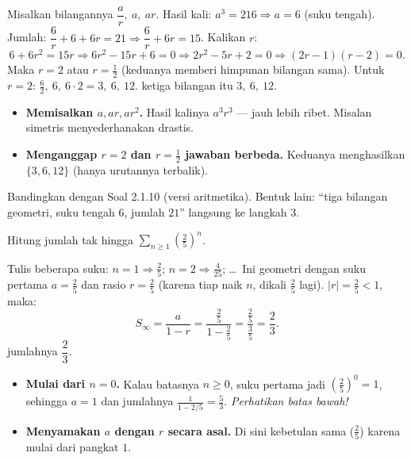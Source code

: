\jawab
{} Misalkan bilangannya $\dfrac ar,\ a,\ ar$.
 Hasil kali: $a^3=216 \Rightarrow a=6$ (suku tengah).
 Jumlah: $\dfrac6r+6+6r=21 \Rightarrow \dfrac6r+6r=15$. Kalikan $r$:
\[
6+6r^2=15r \Rightarrow 6r^2-15r+6=0 \Rightarrow 2r^2-5r+2=0 \Rightarrow (2r-1)(r-2)=0.
\]
Maka $r=2$ atau $r=\frac12$ (keduanya memberi himpunan bilangan sama).
 Untuk $r=2$: $\frac62,\ 6,\ 6\cdot2 = 3,\ 6,\ 12$.
\jadi ketiga bilangan itu $3,\ 6,\ 12$.

\begin{jebakan}
\begin{itemize}[leftmargin=*,topsep=2pt]
  \item \textbf{Memisalkan $a,ar,ar^2$.} Hasil kalinya $a^3r^3$ --- jauh lebih
  ribet. Misalan simetris menyederhanakan drastis.
  \item \textbf{Menganggap $r=2$ dan $r=\frac12$ jawaban berbeda.} Keduanya
  menghasilkan $\{3,6,12\}$ (hanya urutannya terbalik).
\end{itemize}
\end{jebakan}

\begin{variasi}
Bandingkan dengan Soal 2.1.10 (versi aritmetika). Bentuk lain: ``tiga bilangan
geometri, suku tengah $6$, jumlah $21$'' langsung ke langkah 3.
\end{variasi}

\begin{soalbox}{}
Hitung jumlah tak hingga $\displaystyle\sum_{n\ge1}\left(\tfrac25\right)^{n}$.
\end{soalbox}

\jawab
{} Tulis beberapa suku: $n=1\Rightarrow\frac25$; $n=2\Rightarrow\frac{4}{25}$;
\dots\ Ini geometri dengan suku pertama $a=\frac25$ dan rasio $r=\frac25$
(karena tiap naik $n$, dikali $\frac25$ lagi).
 $|r|=\frac25<1$, maka:
\[
S_\infty=\frac{a}{1-r}=\frac{\frac25}{1-\frac25}=\frac{\frac25}{\frac35}=\frac23.
\]
\jadi jumlahnya $\dfrac23$.

\begin{jebakan}
\begin{itemize}[leftmargin=*,topsep=2pt]
  \item \textbf{Mulai dari $n=0$.} Kalau batasnya $n\ge0$, suku pertama jadi
  $\left(\frac25\right)^0=1$, sehingga $a=1$ dan jumlahnya $\frac{1}{1-2/5}
  =\frac53$. \emph{Perhatikan batas bawah!}
  \item \textbf{Menyamakan $a$ dengan $r$ secara asal.} Di sini kebetulan sama
  ($\frac25$) karena mulai dari pangkat $1$.
\end{itemize}
\end{jebakan}

